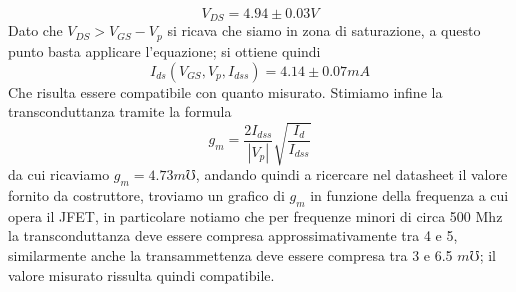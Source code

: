 \documentclass[10pt, a4paper, italian]{article}
\begin{document}
\[
V_{DS}=4.94 \pm 0.03 V
\]
Dato che $V_{DS} > V_{GS} - V_p$ si ricava che siamo in zona di saturazione, a questo punto basta applicare l'equazione; si ottiene quindi 
\[
I_{ds}(V_{GS},V_p,I_{dss})=4.14 \pm 0.07 mA
\]
Che risulta essere compatibile con quanto misurato.
Stimiamo infine la transconduttanza tramite la formula
\begin{equation}
g_m = \frac{2 I_{dss}}{|V_p|}\sqrt{\frac{I_{d}}{I_{dss}}}
\end{equation}
da cui ricaviamo $g_m = 4.73 \si{m\mho}$, andando quindi a ricercare nel datasheet il valore fornito da costruttore, troviamo un grafico di $g_m$ in funzione della frequenza a cui opera il JFET, in particolare notiamo che per frequenze minori di circa 500 Mhz la transconduttanza deve essere compresa approssimativamente tra 4 e 5, similarmente anche la transammettenza deve essere compresa tra 3 e 6.5 $\si{m\mho}$; il valore misurato rissulta quindi compatibile.
\end{document}
